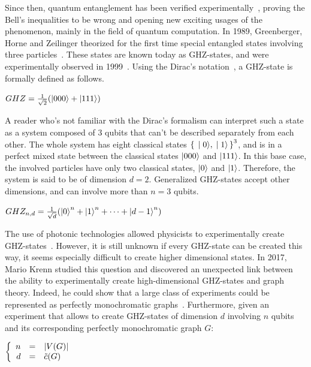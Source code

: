 Since then, quantum entanglement has been verified experimentally~\cite{2012QuantumTA}, proving the Bell's inequalities to be wrong and opening new exciting usages of the phenomenon, mainly in the field of quantum computation.
In 1989, Greenberger, Horne and Zeilinger theorized for the first time special entangled states involving three particles~\cite{GHZ}.
These states are known today as GHZ-states, and were experimentally observed in 1999~\cite{Bouwmeester_1999}.
Using the Dirac's notation~\cite{dirac1939}, a GHZ-state is formally defined as follows. \\

\begin{center}
    $GHZ = \frac{1}{\sqrt{2}}(\ket{000} + \ket{111})$
\end{center}

A reader who's not familiar with the Dirac's formalism can interpret such a state as a system composed of 3 qubits that can't be described separately from each other.
The whole system has eight classical states $\set{\ket{0}, \ket{1}}^3$, and is in a perfect mixed state between the classical states $\ket{000}$ and $\ket{111}$.
In this base case, the involved particles have only two classical states, $\ket{0}$ and $\ket{1}$.
Therefore, the system is said to be of dimension $d = 2$.   %
Generalized GHZ-states accept other dimensions, and can involve more than $n = 3$ qubits.

\begin{center}
    $GHZ_{n, d} = \frac{1}{\sqrt{d}}(\ket{0}^n + \ket{1}^n + \dots + \ket{d-1}^n)$
\end{center}

The use of photonic technologies allowed physicists to experimentally create GHZ-states~\cite{wang2016experimental}.
However, it is still unknown if every GHZ-state can be created this way, it seems especially difficult to create higher dimensional states.
In 2017, Mario Krenn studied this question and discovered an unexpected link between the ability to experimentally create high-dimensional GHZ-states and graph theory.
Indeed, he could show that a large class of experiments could be represented as perfectly monochromatic graphs~\cite{Krenn_2017}.
Furthermore, given an experiment that allows to create GHZ-states of dimension $d$ involving $n$ qubits and its corresponding perfectly monochromatic graph $G$:

\begin{center}
    $\left\{
        \begin{array}{r c l}
            n & = & \left|V(G)\right| \\
            d & = & \Tilde{c}(G)
        \end{array}
    \right.$
\end{center}

